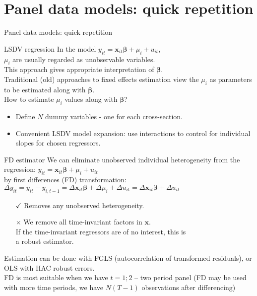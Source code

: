 \documentclass{beamer}
\begin{document}
\section{Panel data models: quick repetition}
\begin{frame}{Panel data models: quick repetition}
\end{frame}
\begin{frame}{LSDV regression}
In the model $y_{it} = \bm{x}_{it} \bm{\beta} + \mu_i + u_{it}$, \\
\medskip
$\mu_i$ are usually regarded as unobservable variables. \\
This approach gives appropriate interpretation of $\bm{\beta}$. \\
Traditional (old) approaches to fixed effects estimation view the $\mu_i$ as parameters to be estimated along with $\bm{\beta}$. \\
\medskip
How to estimate $\mu_i$ values along with $\bm{\beta}$?
\begin{itemize}
\item Define $N$ dummy variables - one for each cross-section.
\item Convenient LSDV model expansion: use interactions to control for individual slopes for chosen regressors.
\end{itemize}
\end{frame}
\begin{frame}{FD estimator}
We can eliminate unobserved individual heterogeneity from the regression: \quad $y_{it} = \bm{x}_{it} \bm{\beta} + \mu_i + u_{it}$ \\
by first differences (FD) transformation: \\
$\Delta y_{it} = y_{it} - y_{i,t-1} = \Delta \bm{x}_{it} \bm{\beta} + \Delta \mu_i + \Delta u_{it} = \Delta \bm{x}_{it} \bm{\beta} + \Delta u_{it}$
\begin{itemize}
\item[$\checkmark$] Removes any unobserved heterogeneity.
\item[$\times$] We remove all time-invariant factors in $\bm{x}$.\\
If the time-invariant regressors are of no interest, this is \\a robust estimator.
\end{itemize}
Estimation can be done with FGLS (autocorrelation of transformed residuals), or OLS with HAC robust errors. \\
\medskip
FD is most suitable when we have $t = 1; 2$ – two period panel (FD may be used with more time periods, we have $N(T-1)$ observations after differencing)
\end{frame}
\end{document}
